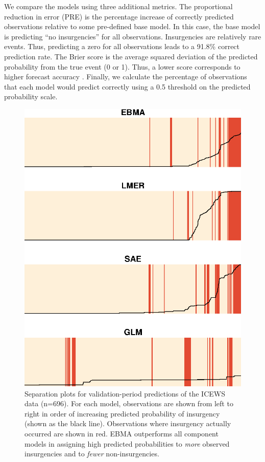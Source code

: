 \documentclass[12pt,fullpage,endnotes]{article}
\begin{document}
We compare the models using three additional metrics.  The
proportional reduction in error (PRE) is the percentage increase of
correctly predicted observations relative to some pre-defined base
model. In this case, the base model is predicting ``no insurgencies''
for all observations.  Insurgencies are relatively rare events.  Thus,
predicting a zero for all observations leads to a 91.8\% correct
prediction rate. The Brier score is the average squared deviation of
the predicted probability from the true event (0 or 1).  Thus, a lower
score corresponds to higher forecast accuracy \citep{Brier:1950}.
Finally, we calculate the percentage of observations that each model
would predict correctly using a 0.5 threshold on the predicted
probability scale.

\begin{figure}[h!]
 \caption{\footnotesize Separation plots for validation-period
    predictions of the ICEWS data (n=696).  For each model,
    observations are shown from left to right in order of increasing
    predicted probability of insurgency (shown as the black line).
    Observations where insurgency actually occurred are shown in
    red. EBMA outperforms all component models in assigning high
    predicted probabilities to \textit{more} observed insurgencies and
    to \textit{fewer} non-insurgencies.}
\label{InSam1sep}
\begin{center}
\includegraphics{Insample}
\end{center}
\end{figure}
\end{document}

